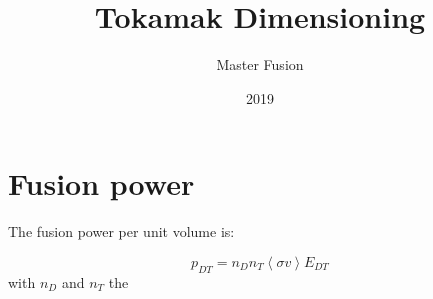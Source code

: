 \documentclass{article}
\title{Tokamak Dimensioning}
\author{Master Fusion}
\date{2019}
\begin{document}
\maketitle

\section{Fusion power}
The fusion power per unit volume is: 

\begin{equation}
    p_{DT} = n_D n_T \left< \sigma v \right> E_{DT}
\end{equation}
with $n_D$ and $n_T$ the 

 




\end{document}
